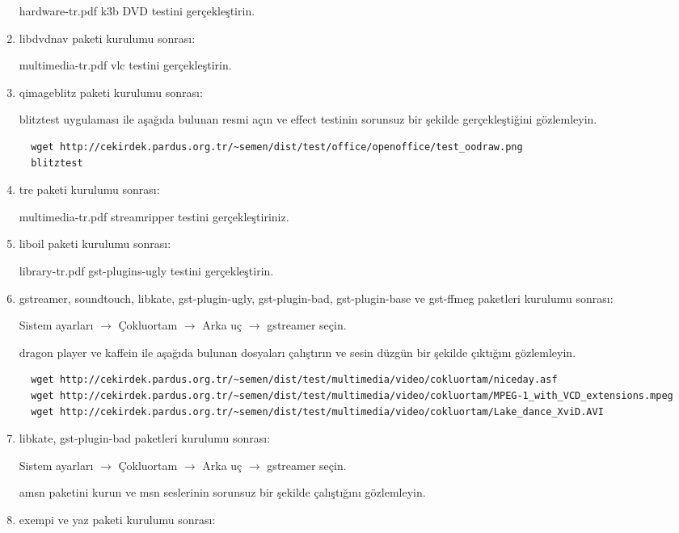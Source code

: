 \documentclass[a4paper,10pt]{article}
\begin{document}
\begin{enumerate}
hardware-tr.pdf k3b DVD testini gerçekleştirin.

\item libdvdnav paketi kurulumu sonrası:

multimedia-tr.pdf vlc testini gerçekleştirin.

\item qimageblitz paketi kurulumu sonrası:

blitztest uygulaması ile aşağıda bulunan resmi açın ve effect testinin sorunsuz bir şekilde gerçekleştiğini gözlemleyin.
\begin{verbatim}
  wget http://cekirdek.pardus.org.tr/~semen/dist/test/office/openoffice/test_oodraw.png
  blitztest
\end{verbatim}


\item tre paketi kurulumu sonrası:

multimedia-tr.pdf streamripper testini gerçekleştiriniz.

\item liboil paketi kurulumu sonrası:

library-tr.pdf gst-plugins-ugly testini gerçekleştirin.

\item gstreamer, soundtouch, libkate, gst-plugin-ugly, gst-plugin-bad, gst-plugin-base ve gst-ffmeg paketleri kurulumu sonrası:

Sistem ayarları $\rightarrow$ Çokluortam $\rightarrow$ Arka uç $\rightarrow$ gstreamer seçin. 

dragon player ve kaffein ile aşağıda bulunan dosyaları çalıştırın ve sesin düzgün bir şekilde çıktığını gözlemleyin.
\begin{verbatim}
  wget http://cekirdek.pardus.org.tr/~semen/dist/test/multimedia/video/cokluortam/niceday.asf
  wget http://cekirdek.pardus.org.tr/~semen/dist/test/multimedia/video/cokluortam/MPEG-1_with_VCD_extensions.mpeg
  wget http://cekirdek.pardus.org.tr/~semen/dist/test/multimedia/video/cokluortam/Lake_dance_XviD.AVI
\end{verbatim}

\item libkate, gst-plugin-bad paketleri kurulumu sonrası:

Sistem ayarları $\rightarrow$ Çokluortam $\rightarrow$ Arka uç $\rightarrow$ gstreamer seçin. 

amsn paketini kurun ve msn seslerinin sorunsuz bir şekilde çalıştığını gözlemleyin.


\item exempi ve yaz paketi kurulumu sonrası:


\end{enumerate}
\end{document}
